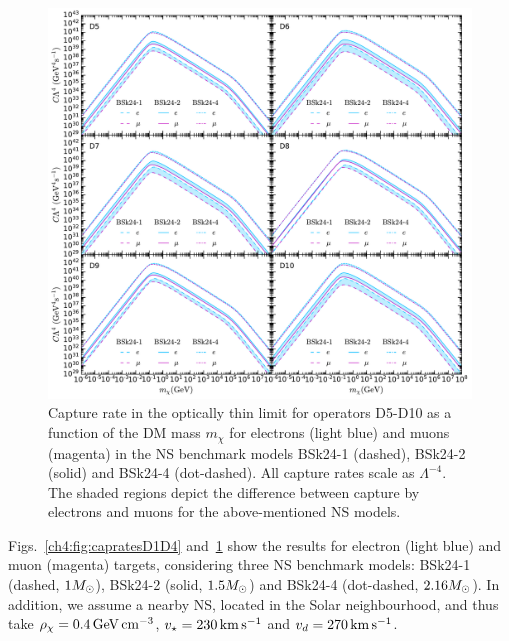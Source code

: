      \begin{figure}[t!bp] 
    \centering
    \includegraphics[width=\textwidth]{capture_2/D5_D10_C_mDM_lept.pdf}
    \caption[Capture rate in the optically thin limit for operators D5-D10 as a function of the DM mass $m_\chi$ for electrons (light blue) and muons (magenta) in the NS benchmark models BSk24-1 (dashed), BSk24-2 (solid) and BSk24-4 (dot-dashed).]{Capture rate in the optically thin limit for operators D5-D10 as a function of the DM mass $m_\chi$ for electrons (light blue) and muons (magenta) in the NS benchmark models BSk24-1 (dashed), BSk24-2 (solid) and BSk24-4 (dot-dashed). All capture rates scale as $\Lambda^{-4}$. The shaded regions depict the difference between capture by electrons and muons for the above-mentioned NS models. 
    }
    \label{ch4:fig:capratesD5D10}
    \end{figure}

    

Figs.~\ref{ch4:fig:capratesD1D4} and~\ref{ch4:fig:capratesD5D10} show the results for electron (light blue) and muon (magenta) targets, considering three NS benchmark models: BSk24-1 (dashed, $1M_\odot$), BSk24-2 (solid, $1.5M_\odot$) and BSk24-4 (dot-dashed, $2.16M_\odot$). In addition, we assume a nearby NS, located in the Solar neighbourhood, and thus take $\rho_\chi=0.4{\rm \,GeV}{\rm \,cm}^{-3}$, $v_\star=230{\rm \,km}{\rm \,s}^{-1}$ and $v_d=270{\rm \,km}{\rm \,s}^{-1}$.  

